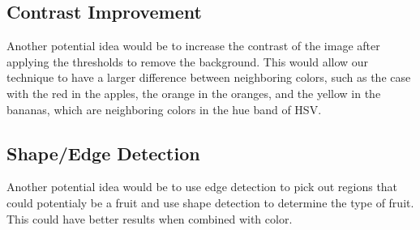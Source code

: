 \documentclass{article}
\begin{document}
\subsection{Contrast Improvement}
Another potential idea would be to increase the contrast of the image after applying the thresholds to remove the background. This would allow our technique to have a larger difference between neighboring colors, such as the case with the red in the apples, the orange in the oranges, and the yellow in the bananas, which are neighboring colors in the hue band of HSV.    
\subsection{Shape/Edge Detection}
Another potential idea would be to use edge detection to pick out regions that could potentialy be a fruit and use shape detection to determine the type of fruit. This could have better results when combined with color. 
\end{document}
